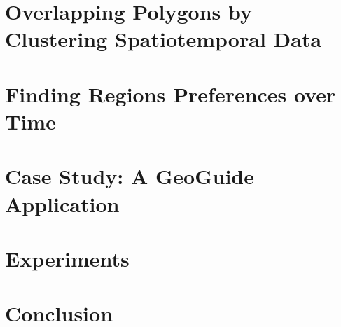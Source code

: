 \documentclass[runningheads,a4paper]{llncs}
\begin{document}
\section{Overlapping Polygons by Clustering Spatiotemporal Data}

\section{Finding Regions Preferences over Time}

\section{Case Study: A GeoGuide Application}

\section{Experiments}


\section{Conclusion}





\vspace{-5pt}



\end{document}
